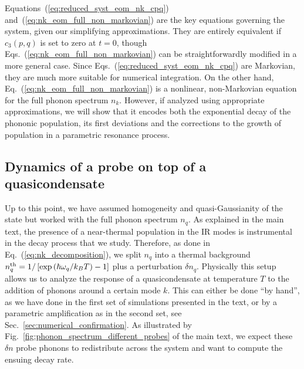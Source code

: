 \documentclass[aps,prd,notitlepage,amsfonts,amssymb,amsmath,nofootinbib,superscriptaddress,longbibliography]{revtex4-2}
\begin{document}
\begin{appendices}
Equations~(\ref{eq:reduced_syst_eom_nk_cpq}) and~(\ref{eq:nk_eom_full_non_markovian}) are the key equations governing the system, given our simplifying approximations.  They are entirely equivalent if $c_{3}(p,q)$ is set to zero at $t=0$, though Eqs.~(\ref{eq:nk_eom_full_non_markovian}) can be straightforwardly modified in a more general case.  Since Eqs.~(\ref{eq:reduced_syst_eom_nk_cpq}) are Markovian, they are much more suitable for numerical integration.  On the other hand, Eq.~(\ref{eq:nk_eom_full_non_markovian}) is a nonlinear, non-Markovian equation for the full phonon spectrum $n_{k}$. However, if analyzed using appropriate approximations, we will show that it encodes both the exponential decay of the phononic population, its first deviations and the corrections to the growth of population in a parametric resonance process. 

\subsection{Dynamics of a probe on top of a quasicondensate}
\label{subsubsec:eom_for_probe_new}

Up to this point, we have assumed homogeneity and quasi-Gaussianity of the state but worked with the full phonon spectrum $n_q$. As explained in the main text, the presence of a near-thermal population in the IR modes is instrumental in the decay process that we study. Therefore, as done in Eq.~(\ref{eq:nk_decomposition}), we split $n_q$ into a thermal background $n^{\rm th}_{q} = 1/\left[{\rm exp}\left(\hbar\omega_{q}/k_{B}T\right)-1\right]$ plus a perturbation $\delta n_q$. Physically this setup allows us to analyze the response of a quasicondensate at temperature $T$ to the addition of phonons around a certain mode $k$. This can either be done ``by hand'', as we have done in the first set of simulations presented in the text, or by a parametric amplification as in the second set, see Sec.~\ref{sec:numerical_confirmation}. As illustrated by Fig.~\ref{fig:phonon_spectrum_different_probes} of the main text, we expect these $\delta n$ probe phonons to redistribute across the system and want to compute the ensuing decay rate.  


\end{appendices}
\end{document}

